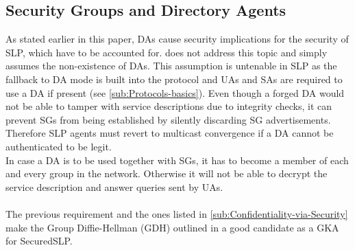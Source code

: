 \subsection{Security Groups and Directory Agents}
As stated earlier in this paper, DAs cause security implications for the security of SLP, which have to be accounted for. \citet{Hollick2001} does not address this topic and simply assumes the non-existence of DAs. This assumption is untenable in SLP as the fallback to DA mode is built into the protocol and UAs and SAs are required to use a DA if present (see \ref{sub:Protocols-basics}). Even though a forged DA would not be able to tamper with service descriptions due to integrity checks, it can prevent SGs from being established by silently discarding SG advertisements. Therefore SLP agents must revert to multicast convergence if a DA cannot be authenticated to be legit.\\
In case a DA is to be used together with SGs, it has to become a member of each and every group in the network. Otherwise it will not be able to decrypt the service description and answer queries sent by UAs.\\\\
The previous requirement and the ones listed in \ref{sub:Confidentiality-via-Security} make the Group Diffie-Hellman (GDH) outlined in \citet{Bhaskar2007} a good candidate as a GKA for SecuredSLP.